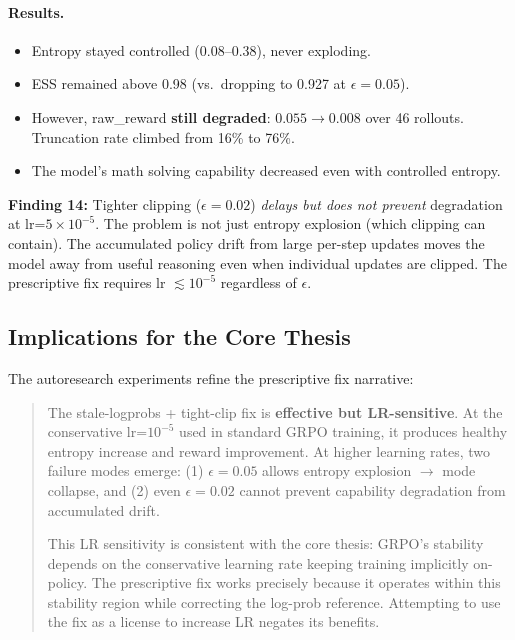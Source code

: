 \documentclass[11pt,a4paper]{article}
\begin{document}
\paragraph{Results.}
\begin{itemize}[leftmargin=*]
  \item Entropy stayed controlled (0.08--0.38), never exploding.
  \item ESS remained above 0.98 (vs.\ dropping to 0.927 at $\epsilon = 0.05$).
  \item However, raw\_reward \textbf{still degraded}: $0.055 \to 0.008$ over
    46 rollouts. Truncation rate climbed from 16\% to 76\%.
  \item The model's math solving capability decreased even with controlled
    entropy.
\end{itemize}

\begin{keyinsight}
\textbf{Finding 14:} Tighter clipping ($\epsilon = 0.02$) \emph{delays but does
not prevent} degradation at lr=$5 \times 10^{-5}$. The problem is not just
entropy explosion (which clipping can contain). The accumulated policy drift from
large per-step updates moves the model away from useful reasoning even when
individual updates are clipped. The prescriptive fix requires
lr $\lesssim 10^{-5}$ regardless of $\epsilon$.
\end{keyinsight}

\subsection{Implications for the Core Thesis}

The autoresearch experiments refine the prescriptive fix narrative:

\begin{quote}
The stale-logprobs + tight-clip fix is \textbf{effective but LR-sensitive}. At
the conservative lr=$10^{-5}$ used in standard GRPO training, it produces
healthy entropy increase and reward improvement. At higher learning rates, two
failure modes emerge: (1) $\epsilon = 0.05$ allows entropy explosion $\to$ mode
collapse, and (2) even $\epsilon = 0.02$ cannot prevent capability degradation
from accumulated drift.

This LR sensitivity is consistent with the core thesis: GRPO's stability
depends on the conservative learning rate keeping training implicitly on-policy.
The prescriptive fix works precisely because it operates within this stability
region while correcting the log-prob reference. Attempting to use the fix as a
license to increase LR negates its benefits.
\end{quote}
\end{document}
